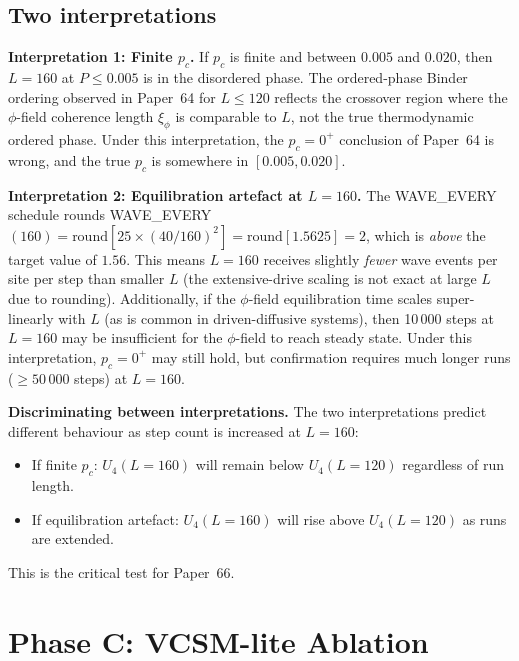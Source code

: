 \documentclass[12pt,a4paper]{article}
\begin{document}
\subsection{Two interpretations}

\textbf{Interpretation 1: Finite $p_c$.}
If $p_c$ is finite and between $0.005$ and $0.020$,
then $L=160$ at $P \leq 0.005$ is in the disordered phase.
The ordered-phase Binder ordering observed in Paper~64 for $L \leq 120$
reflects the crossover region where the $\phi$-field coherence length
$\xi_\phi$ is comparable to $L$, not the true thermodynamic ordered phase.
Under this interpretation, the $p_c = 0^+$ conclusion of Paper~64 is wrong,
and the true $p_c$ is somewhere in $[0.005, 0.020]$.

\textbf{Interpretation 2: Equilibration artefact at $L=160$.}
The WAVE\_EVERY schedule rounds WAVE\_EVERY$(160) = \text{round}[25 \times (40/160)^2]
= \text{round}[1.5625] = 2$,
which is \emph{above} the target value of $1.56$.
This means $L=160$ receives slightly \emph{fewer} wave events per site per step
than smaller $L$ (the extensive-drive scaling is not exact at large $L$ due to rounding).
Additionally, if the $\phi$-field equilibration time scales super-linearly with $L$
(as is common in driven-diffusive systems), then 10\,000 steps at $L=160$
may be insufficient for the $\phi$-field to reach steady state.
Under this interpretation, $p_c = 0^+$ may still hold,
but confirmation requires much longer runs ($\geq 50\,000$ steps) at $L=160$.

\textbf{Discriminating between interpretations.}
The two interpretations predict different behaviour as step count is increased at $L=160$:
\begin{itemize}
  \item If finite $p_c$: $U_4(L=160)$ will remain below $U_4(L=120)$ regardless of run length.
  \item If equilibration artefact: $U_4(L=160)$ will rise above $U_4(L=120)$
    as runs are extended.
\end{itemize}
This is the critical test for Paper~66.

\section{Phase C: VCSM-lite Ablation}
\end{document}
